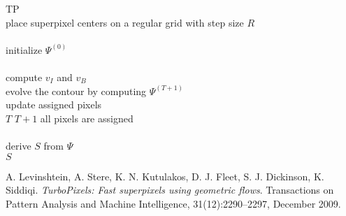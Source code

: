 \documentclass[12pt,a4paper]{article}
\begin{document}
	\begin{algorithm}[t]
		\begin{algo}{TP}{\label{algo:related-work-turbopixels}}
			\\
			place superpixel centers on a regular grid with step size $R$\\
			\\
			initialize $\Psi^{(0)}$\\
			\qrepeat\\
				compute $v_I$ and $v_B$\\
				evolve the contour by computing $\Psi^{(T+1)}$\\
				update assigned pixels\\
				$T$ \qlet $T + 1$
			\quntil all pixels are assigned\\
			\\
			derive $S$ from $\Psi$\\
			\qreturn $S$
		\end{algo}
		\caption{The superpixel algorithm \textbf{TP} proposed in \cite{LevinshteinStereKutulakosFleetDickinsonSiddiqi}.}
		\label{fig:related-work-tp-algorithm}
	\end{algorithm}

	\begin{thebibliography}{1}
		A. Levinshtein, A. Stere, K. N. Kutulakos, D. J. Fleet, S. J. Dickinson, K. Siddiqi.
		\emph{TurboPixels: Fast superpixels using geometric flows}.
		Transactions on Pattern Analysis and Machine Intelligence, 31(12):2290–2297, December 2009.
	\end{thebibliography}
\end{document}
